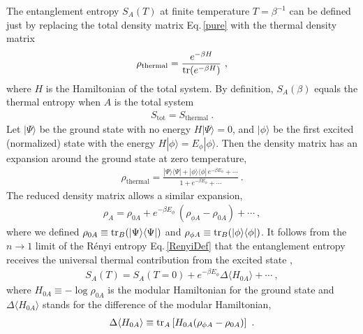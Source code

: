 The entanglement entropy $S_A(T)$ at finite temperature $T=\beta^{-1}$ can be defined just by replacing the total density matrix Eq.\,\eqref{pure} with the thermal density matrix
\begin{align}
	\rho_\text{thermal}=\frac{e^{-\beta H}}{{\rm tr}(e^{-\beta H})}\ ,
\end{align}
where $H$ is the Hamiltonian of the total system.
By definition, $S_A(\beta)$ equals the thermal entropy when $A$ is the total system
\begin{align}
	S_\text{tot} = S_\text{thermal}  \ .
\end{align}
Let $|\Psi\rangle$ be the ground state with no energy $H|\Psi\rangle = 0$, and $|\phi\rangle$ be the first excited (normalized) state with the energy $H|\phi\rangle = E_\phi |\phi\rangle$.
Then the density matrix has an expansion around the ground state at zero temperature,
\begin{align}
	\rho_\text{thermal}=\frac{|\Psi\rangle \langle\Psi |  + |\phi\rangle \langle \phi |\, e^{-\beta E_\phi} + \cdots}{1 + e^{-\beta E_\phi} + \cdots}\ .
\end{align}
The reduced density matrix allows a similar expansion,
\begin{align}
	\rho_A = \rho_{0A} + e^{-\beta E_\phi}\, (\rho_{\phi A}  - \rho_{0A}) + \cdots \ ,
\end{align}
where we defined $\rho_{0A} \equiv {\rm tr}_B (|\Psi\rangle \langle \Psi |)$ and $\rho_{\phi A} \equiv  {\rm tr}_B (|\phi\rangle \langle \phi |)$.
It follows from the $n\to 1$ limit of the R{\'e}nyi entropy Eq.\,\eqref{RenyiDef} that 
the entanglement entropy receives the universal thermal contribution from the excited state \cite{Cardy:2014jwa,Herzog:2014fra},
\begin{align}
	S_A (T) = S_A (T=0) + e^{-\beta E_\phi} \Delta \langle H_{0A}\rangle + \cdots \ ,
\end{align}
where $H_{0A} \equiv - \log \rho_{0A}$ is the modular Hamiltonian for the ground state and $\Delta \langle H_{0A}\rangle$ stands for the difference of the modular Hamiltonian,
\begin{align}
	\Delta \langle H_{0A}\rangle  \equiv {\rm tr}_A\left[ H_{0A} (\rho_{\phi A} - \rho_{0A})\right] \ .
\end{align}





\endinput